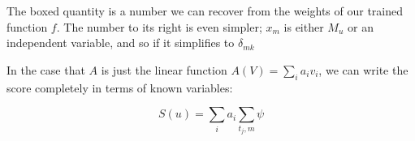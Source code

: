 \documentclass[paper.tex]{subfiles}
\begin{document}
	The boxed quantity is a number we can recover from the weights of our trained function $f$. The number to its right is even simpler; $x_m$ is either $M_u$ or an independent variable, and so if it simplifies to $\delta_{mk}$
	
	In the case that $A$ is just the linear function $A(V) = \sum_i a_i v_i$, we can write the score completely in terms of known variables:
	
	\begin{equation}
		S(u) = \sum_i a_i \sum_{t_j, m} \psi 
	\end{equation}
	
\end{document}
